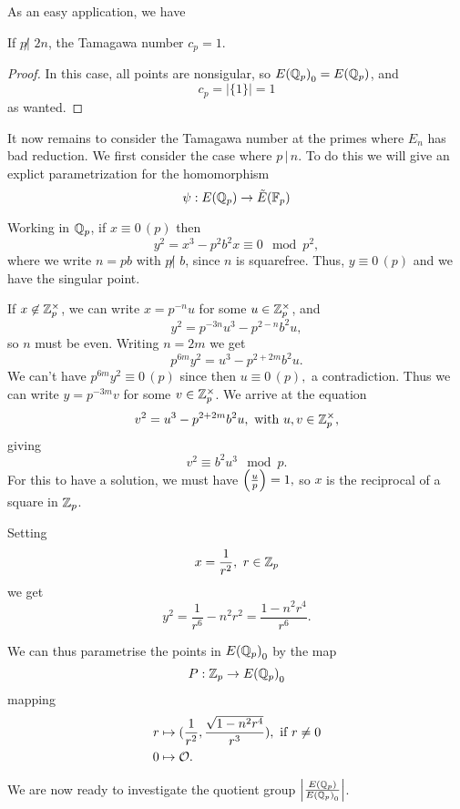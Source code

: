 \documentclass[12pt, a4paper]{amsart}
\begin{document}
As an easy application, we have

\begin{cor}
  If $p \not| \,\, 2n$, the Tamagawa number $c_p = 1$.
\end{cor}

\begin{proof}
  In this case, all points are nonsigular, so ${E({\mathbb Q}_p)}_0 = {E({\mathbb Q}_p)}$, and
  \[c_p = \left| \{1\} \right| = 1\]
  as wanted.
\end{proof}

It now remains to consider the Tamagawa number at the primes where $E_n$ has
bad reduction. We first consider the case where $p \, | \, n$. To do this
we will give an explict parametrization for the homomorphism
\[\psi : {E({\mathbb Q}_p)} \rightarrow {\tilde{E}(\mathbb{F}_p)}\]

Working in ${\mathbb Q}_p$, if $x \equiv 0 \, (p)$ then
\[y^2 = x^3 - p^{2}b^2 x \equiv 0 \mod{p^2}, \]
where we write $n = p b$ with $p \not| \,\, b $, since $n$ is squarefree.
Thus, $y \equiv 0 \, (p)$ and we have the singular point.

If $x \not\in {\mathbb Z}_p^\times$, we can write $x = p^{-n} u$ for some $u \in
{\mathbb Z}_p^\times$, and
\[y^2 = p^{-3n}u^3 - p^{2-n}b^2u,\]
so $n$ must be even. Writing $n = 2m$ we get
\[p^{6m}y^2 = u^3 - p^{2+2m}b^2u.\]
We can't have $p^{6m}y^2 \equiv 0 \, (p)$ since then
$u \equiv 0 \, (p),$ a contradiction. Thus we can write
$y = p^{-3m}v$ for some $v \in \mathbb{Z}_p^\times$. We arrive at the equation
\[v^2 = u^3 - p^{2+2m}b^2u, \text{ with } u, v \in \mathbb{Z}_p^\times,\]
giving
\[v^2 \equiv b^2u^3 \mod{p}.\]
For this to have a solution, we must have $\left(\frac{u}{p}\right) = 1,$
so $x$ is the reciprocal of a square in ${\mathbb Z}_p$.

Setting 
\[x = \frac{1}{r^2}, \,\, r \in {\mathbb Z}_p\]
we get
\[y^2 = \frac{1}{r^6}-{n^2}{r^2} = \frac{1-n^2r^4}{r^6}.\]

We can thus parametrise the points in ${E({\mathbb Q}_p)}_0$ by the map
\[
    P : {\mathbb Z}_p \rightarrow {E({\mathbb Q}_p)}_0  \]
mapping
\begin{equation} \label{eq:p-param}
  \begin{split}
    r &\mapsto (\frac{1}{r^2}, \frac{\sqrt{1-n^2r^4}}{r^3}), \text{ if } r \neq 0 \\
    0 &\mapsto {\mathcal O}.
  \end{split}
\end{equation}

We are now ready to investigate the quotient group $\left| \frac{{E({\mathbb Q}_p)}}{{E({\mathbb Q}_p)}_0}
\right|$.
\end{document}
